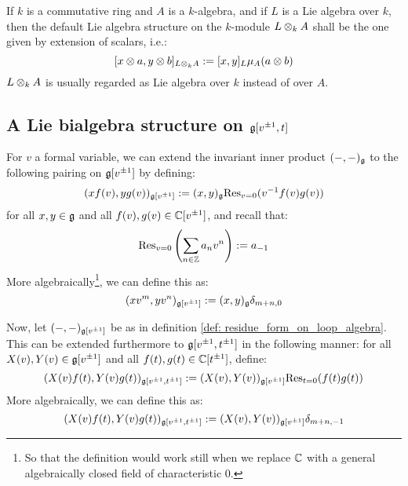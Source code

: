         \begin{convention}
            If $k$ is a commutative ring and $A$ is a $k$-algebra, and if $L$ is a Lie algebra over $k$, then the default Lie algebra structure on the $k$-module $L \tensor_k A$ shall be the one given by extension of scalars, i.e.:
                $$[x \tensor a, y \tensor b]_{L \tensor_k A} := [x, y]_L \mu_A(a \tensor b)$$
            $L \tensor_k A$ is usually regarded as Lie algebra over $k$ instead of over $A$.  
        \end{convention}
    
        \subsection{A Lie bialgebra structure on \texorpdfstring{$\mathfrak{g}[v^{\pm 1}, t]$}{}}
            \begin{definition} \label{def: residue_form_on_loop_algebra}
                For $v$ a formal variable, we can extend the invariant inner product $(-, -)_{\mathfrak{g}}$ to the following pairing on $\mathfrak{g}[v^{\pm 1}]$ by defining:
                    $$(x f(v), y g(v))_{\mathfrak{g}[v^{\pm 1}]} := (x, y)_{\mathfrak{g}} \mathrm{Res}_{v = 0}( v^{-1} f(v) g(v) )$$
                for all $x, y \in \mathfrak{g}$ and all $f(v), g(v) \in \mathbb{C}[v^{\pm 1}]$, and recall that:
                    $$\mathrm{Res}_{v = 0}\left( \sum_{n \in \mathbb{Z}} a_n v^n \right) := a_{-1}$$
                More algebraically\footnote{So that the definition would work still when we replace $\mathbb{C}$ with a general algebraically closed field of characteristic $0$.}, we can define this as:
                    $$(x v^m, y v^n)_{\mathfrak{g}[v^{\pm 1}]} := (x, y)_{\mathfrak{g}} \delta_{m + n, 0}$$
            \end{definition}
            \begin{definition} \label{def: residue_form_on_multi_loop_algebra}
                Now, let $(-, -)_{\mathfrak{g}[v^{\pm 1}]}$ be as in definition \ref{def: residue_form_on_loop_algebra}. This can be extended furthermore to $\mathfrak{g}[v^{\pm 1}, t^{\pm 1}]$ in the following manner: for all $X(v), Y(v) \in \mathfrak{g}[v^{\pm 1}]$ and all $f(t), g(t) \in \mathbb{C}[t^{\pm 1}]$, define:
                    $$(X(v) f(t), Y(v) g(t))_{\mathfrak{g}[v^{\pm 1}, t^{\pm 1}]} := (X(v), Y(v))_{\mathfrak{g}[v^{\pm 1}]} \mathrm{Res}_{t = 0}( f(t) g(t) )$$
                More algebraically, we can define this as:
                    $$(X(v) f(t), Y(v) g(t))_{\mathfrak{g}[v^{\pm 1}, t^{\pm 1}]} := (X(v), Y(v))_{\mathfrak{g}[v^{\pm 1}]} \delta_{m + n, -1}$$
            \end{definition}

